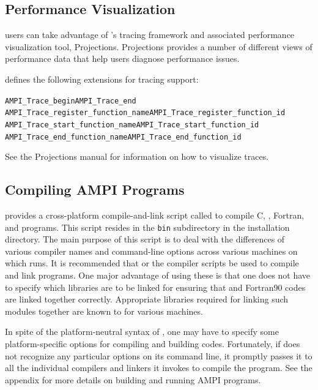 \documentclass[10pt]{article}
\begin{document}
\subsection{Performance Visualization}
\ampi{} users can take advantage of \charmpp{}'s tracing framework and
associated performance visualization tool, Projections. Projections
provides a number of different views of performance data that help
users diagnose performance issues.

\ampi{} defines the following extensions for tracing support:

\begin{alltt}
AMPI_Trace_begin                      AMPI_Trace_end
AMPI_Trace_register_function_name     AMPI_Trace_register_function_id
AMPI_Trace_start_function_name        AMPI_Trace_start_function_id
AMPI_Trace_end_function_name          AMPI_Trace_end_function_id
\end{alltt}

See the Projections manual for information on how to visualize traces.

\subsection{Compiling AMPI Programs}

\charmpp{} provides a cross-platform compile-and-link script called \charmc{}
to compile C, \CC{}, Fortran, \charmpp{} and \ampi{} programs.  This script
resides in the \texttt{bin} subdirectory in the \charmpp{} installation
directory. The main purpose of this script is to deal with the differences of
various compiler names and command-line options across various machines on
which \charmpp{} runs. It is recommended that \charmc{} or the \ampi{} compiler
scripts be used to compile and link \ampi{} programs. One major advantage of
using these is that one does not have to specify which libraries are to be
linked for ensuring that \CC{} and Fortran90 codes are linked together
correctly. Appropriate libraries required for linking such modules together
are known to \charmc{} for various machines.

In spite of the platform-neutral syntax of \charmc{}, one may have to specify
some platform-specific options for compiling and building \ampi{} codes.
Fortunately, if \charmc{} does not recognize any particular options on its
command line, it promptly passes it to all the individual compilers and linkers
it invokes to compile the program. See the appendix for more details on
building and running AMPI programs.
\end{document}
